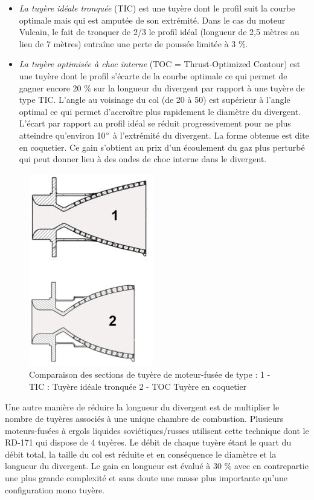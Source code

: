 \documentclass{report}
\begin{document}
\begin{itemize}
    \item \textit{La tuyère idéale tronquée} (TIC) est une tuyère dont le profil suit la courbe optimale mais qui est amputée de son extrémité. Dans le cas du moteur Vulcain, le fait de tronquer de 2/3 le profil idéal (longueur de 2,5 mètres au lieu de 7 mètres) entraîne une perte de poussée limitée à 3 $\%$.
    \item \textit{La tuyère optimisée à choc interne} (TOC = Thrust-Optimized Contour) est une tuyère dont le profil s'écarte de la courbe optimale ce qui permet de gagner encore 20 $\%$ sur la longueur du divergent par rapport à une tuyère de type TIC. L'angle au voisinage du col (de 20 à 50\degree) est supérieur à l'angle optimal ce qui permet d'accroître plus rapidement le diamètre du divergent. L'écart par rapport au profil idéal se réduit progressivement pour ne plus atteindre qu'environ 10$\degree$ à l'extrémité du divergent. La forme obtenue est dite en coquetier. Ce gain s'obtient au prix d'un écoulement du gaz plus perturbé qui peut donner lieu à des ondes de choc interne dans le divergent.
\end{itemize}

\begin{figure}[h!]
    \centering
    \includegraphics[scale=0.7]{48.JPG}
    \caption{Comparaison des sections de tuyère de moteur-fusée de type : 1 - TIC : Tuyère idéale tronquée 2 - TOC Tuyère en coquetier}
    \label{48}
\end{figure}

Une autre manière de réduire la longueur du divergent est de multiplier le nombre de tuyères associés à une unique chambre de combustion. Plusieurs moteurs-fusées à ergols liquides soviétiques/russes utilisent cette technique dont le RD-171 qui dispose de 4 tuyères. Le débit de chaque tuyère étant le quart du débit total, la taille du col est réduite et en conséquence le diamètre et la longueur du divergent. Le gain en longueur est évalué à 30 $\%$ avec en contrepartie une plus grande complexité et sans doute une masse plus importante qu'une configuration mono tuyère.
\end{document}

